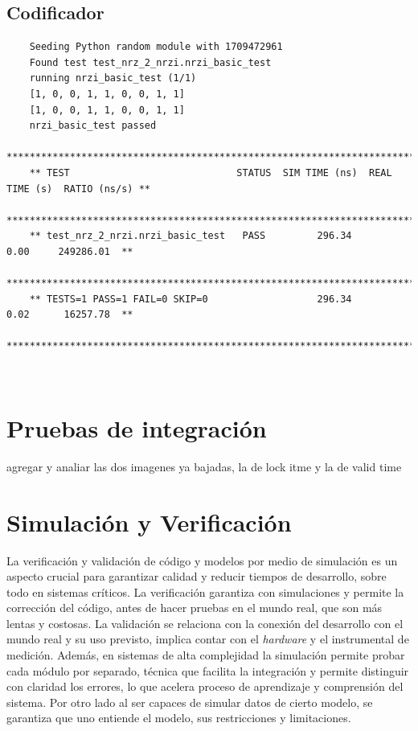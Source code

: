 \subsection{Codificador}

  {\scriptsize\begin{verbatim}
    Seeding Python random module with 1709472961
    Found test test_nrz_2_nrzi.nrzi_basic_test
    running nrzi_basic_test (1/1)
    [1, 0, 0, 1, 1, 0, 0, 1, 1]
    [1, 0, 0, 1, 1, 0, 0, 1, 1]
    nrzi_basic_test passed
    *****************************************************************************************
    ** TEST                             STATUS  SIM TIME (ns)  REAL TIME (s)  RATIO (ns/s) **
    *****************************************************************************************
    ** test_nrz_2_nrzi.nrzi_basic_test   PASS         296.34           0.00     249286.01  **
    *****************************************************************************************
    ** TESTS=1 PASS=1 FAIL=0 SKIP=0                   296.34           0.02      16257.78  **
    *****************************************************************************************
  \end{verbatim}}



{\scriptsize\begin{verbatim}
  
\end{verbatim}}

\section{Pruebas de integración}

agregar y analiar las dos imagenes ya bajadas, la de lock itme y la de valid time

\section{Simulación y Verificación}

La verificación y validación de código y modelos por medio de simulación es
un aspecto crucial para garantizar calidad y reducir tiempos de desarrollo,
sobre todo en sistemas críticos. La verificación garantiza con simulaciones y
permite la corrección del código, antes de hacer pruebas en el mundo real, que
son más lentas y costosas. La validación se relaciona con la conexión del
desarrollo con el mundo real y su uso previsto, implica contar con el
\textit{hardware} y el instrumental de medición. Además, en sistemas de alta
complejidad la simulación permite probar cada módulo por separado, técnica que
facilita la integración y permite distinguir con claridad los errores, lo que
acelera proceso de aprendizaje y comprensión del sistema. Por otro lado al ser
capaces de simular datos de cierto modelo, se garantiza que uno entiende el
modelo, sus restricciones y limitaciones.

